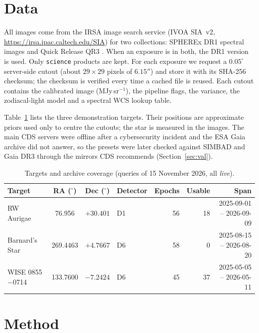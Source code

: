 \documentclass[11pt,a4paper]{article}
\begin{document}
\section{Data}
All images come from the IRSA image search service (IVOA SIA~v2, \url{https://irsa.ipac.caltech.edu/SIA}) for two
collections: SPHEREx DR1 spectral images \parencite{irsa_dr1} and Quick Release QR3 \parencite{irsa_qr3}. When an
exposure is in both, the DR1 version is used. Only \texttt{science} products are kept. For each exposure we request a
$0.05^\circ$ server-side cutout (about $29\times29$ pixels of $6.15''$) and store it with its SHA-256 checksum; the
checksum is verified every time a cached file is reused. Each cutout contains the calibrated image (MJy\,sr$^{-1}$),
the pipeline flags, the variance, the zodiacal-light model and a spectral WCS lookup table.

Table~\ref{tab:targets} lists the three demonstration targets. Their positions are approximate priors used only to
centre the cutouts; the star is measured in the images. The main CDS servers were offline after a cybersecurity
incident \parencite{cds_incident2026} and the ESA Gaia archive did not answer, so the presets were later checked against
SIMBAD \parencite{simbad2000} and Gaia DR3 \parencite{gaiadr3} through the mirrors CDS recommends (Section~\ref{sec:val}).

\begin{table}[h]\centering\small
\caption{Targets and archive coverage (queries of 15 November 2026, all \emph{live}).}\label{tab:targets}
\begin{tabular}{lcclrrr}\toprule
Target & RA ($^\circ$) & Dec ($^\circ$) & Detector & Epochs & Usable & Span \\\midrule
RW Aurigae & 76.956 & $+30.401$ & D1 & 56 & 18 & 2025-09-01 -- 2026-09-09\\
Barnard's Star & 269.4463 & $+4.7667$ & D6 & 58 & 0 & 2025-08-15 -- 2026-08-20\\
WISE 0855$-$0714 & 133.7600 & $-7.2424$ & D6 & 45 & 37 & 2025-05-05 -- 2026-05-11\\\bottomrule
\end{tabular}
\end{table}

\section{Method}
\end{document}
